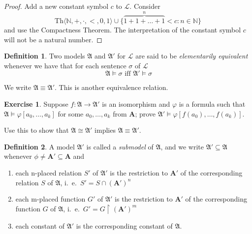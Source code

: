 \documentclass[titlepage, oneside]{amsbook}
\theoremstyle{plain}
\theoremstyle{definition}
\newtheorem{exercise}{Exercise}
\newtheorem{definition}{Definition}
\theoremstyle{remark}
\newcommand{\Th}{\ensuremath{\mbox{Th}}}
\newcommand{\lan}{\ensuremath{\mathcal{L}}}
\newcommand{\ma}{\ensuremath{\mathfrak{A}}}
\newcommand{\ba}{\ensuremath{\mathbf{A}}}
\newcommand{\anot}[2][0]{\ensuremath{ a_{#1} , \dots , a_{#2}}}
\begin{document}
\begin{proof} Add a new constant symbol $c$ to $\lan$. 
Consider \[ \Th\langle \mathbb{N}, + , \cdot ,<,0,1 \rangle  
\cup \{ \overbrace{1+1+\dots +1}^{n} <c  : n \in \mathbb{N} \} \] and
use
the Compactness Theorem.  The interpretation of the constant symbol $c$
will not be a natural number. 
\end{proof}
 

\begin{definition}
%
 Two models $\ma$ and $\ma'$ for $\lan$
are said to be  
\emph{elementarily equivalent} 
whenever we have that for each sentence $\sigma$ of $\mathcal{L}$ \[\ 
\mathfrak{A} \models \sigma \mbox{ iff } \mathfrak{A}' \models \sigma \]

We write $\ma \equiv \ma'$. This is another equivalence relation.
 
\end{definition}


\begin{exercise}\label{X:iso} Suppose $f: \ma \to \ma'$ is an
isomorphism and
$\varphi$ is a formula such that $\ma \models \varphi [ \anot k ] $ for
some $\anot k$ from $\ba$; prove $\ma' \models \varphi [ f(a_0) , \dots ,
f(a_k)]$.


Use this to show that $\ma \cong \ma'$ implies $\ma \equiv \ma'$.
\end{exercise}


\begin{definition}
%
%
 A model $\mathfrak{A}'$ is called a \emph{submodel} of $\mathfrak{A}$, and we
 write $\mathfrak{A}' \subseteq \mathfrak{A}$ whenever  $\phi \neq \mathbf{A}' \subseteq \mathbf{A}$ and 

\begin{enumerate}
\item each n-placed relation $S'$ of $\mathfrak{A}'$ is the restriction 
to $\mathbf{A}'$ of the corresponding relation $S$ of $\mathfrak{A}$, 
i.~e.\ $S'=S \cap (\mathbf{A}')^{n} $



\item each m-placed function $G'$ of $\mathfrak{A}'$ is the restriction 
to $\mathbf{A}'$ of the corresponding function $G$ of $\mathfrak{A}$, 
i.~e.\ $G' =G \! \upharpoonright \! (\mathbf{A}')^{m} $


\item each constant of $\mathfrak{A}'$ is the corresponding constant of 
$\mathfrak{A}$.\\

\end{enumerate}

\end{definition}
\end{document}
